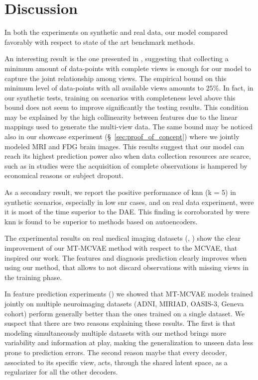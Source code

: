 \section{Discussion}

In both the experiments on synthetic and real data, our model compared favorably with respect to state of the art benchmark methods.

An interesting result is the one presented in , suggesting that collecting a minimum amount of data-points with complete views is enough for our model to capture the joint relationship among views.
The empirical bound on this minimum level of data-points with all available views amounts to $25\%$.
In fact, in our synthetic tests, training on scenarios with completeness level above this bound does not seem to improve significantly the testing results.
This condition may be explained by the high collinearity between features due to the linear mappings used to generate the multi-view data.
The same bound may be noticed also in our showcase experiment (\S~\ref{sec:proof_of_concept}) where we jointly modeled MRI and FDG brain images.
This results suggest that our model can reach its highest prediction power also when data collection resources are scarce,
such as in studies were the acquisition of complete observations is hampered by economical reasons or subject dropout.

As a secondary result, we report the positive performance of knn (k = 5) in synthetic scenarios, especially in low snr cases, and on real data experiment, were it is most of the time superior to the DAE.
This finding is corroborated by \cite{Platias2020} were knn is found to be superior to methods based on autoencoders.

The experimental results on real medical imaging datasets (, ) show the clear improvement of our MT-MCVAE method with respect to the MCVAE, that inspired our work.
The features and diagnosis prediction clearly improves when using our method, that allows to not discard observations with missing views in the training phase.

In feature prediction experiments () we showed that MT-MCVAE models trained jointly on multiple neuroimaging datasets (ADNI, MIRIAD, OASIS-3, Geneva cohort)
perform generally better than the ones trained on a single dataset.
We suspect that there are two reasons explaining these results.
The first is that modeling simultaneously multiple datasets with our method brings more variability and information at play, making the generalization to unseen data less prone to prediction errors.
The second reason maybe that every decoder, associated to its specific view, acts, through the shared latent space, as a regularizer for all the other decoders.


